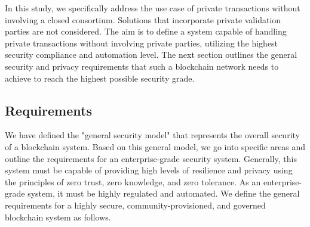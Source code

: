 In this study, we specifically address the use case of private transactions without involving a closed consortium. Solutions that incorporate private validation parties are not considered. The aim is to define a system capable of handling private transactions without involving private parties, utilizing the highest security compliance and automation level.
The next section outlines the general security and privacy requirements that such a blockchain network needs to achieve to reach the highest possible security grade. 

\subsection{Requirements}
We have defined the "general security model" that represents the overall security of a blockchain system. Based on this general model, we go into specific areas and outline the requirements for an enterprise-grade security system. Generally, this system must be capable of providing high levels of resilience and privacy using the principles of zero trust, zero knowledge, and zero tolerance. As an enterprise-grade system, it must be highly regulated and automated. 
We define the general requirements for a highly secure, community-provisioned, and governed blockchain system as follows.         

